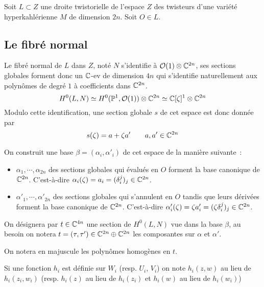 \documentclass[a4paper,10pt,draft,makeidx,twocolumn]{amsart}
\begin{document}
Soit $L \subset Z$ une droite twistorielle de l'espace $Z$ des twisteurs d'une variété hyperkahlérienne $M$ de dimension $2n$. Soit $O \in L$.

\subsection{Le fibré normal}
Le fibré normal de $L$ dans $Z$, noté $N$ s'identifie à $\mathcal{O}(1) \otimes \mathbb{C}^{2n}$, ses sections globales forment donc un $\mathbb{C}$-ev de dimension $4n$ qui s'identifie naturellement aux polynômes de degré $1$ à coefficients dans $\mathbb{C}^{2n}$.
\begin{equation}
H^0(L,N) \simeq H^0(\mathbb{P}^1, \mathcal{O}(1)) \otimes \mathbb{C}^{2n} \simeq \mathbb{C}[\zeta]^1 \otimes \mathbb{C}^{2n}
\end{equation}
Modulo cette identification, une section globale $s$ de cet espace est donc donnée par
\begin{equation}
s(\zeta) = a + \zeta a' \qquad  a,a' \in \mathbb{C}^{2n}
\end{equation}

On construit une base $\beta = (\alpha_i, \alpha'_i)$ de cet espace de la manière suivante~:
\begin{itemize}
\item $\alpha_1, \cdots, \alpha_{2n}$ des sections globales qui évalués en $O$ forment la base canonique de $\mathbb{C}^{2n}$.
C'est-à-dire $\alpha_i(\zeta) = a_i = (\delta_i^j)_j \in \mathbb{C}^{2n}$. 
\item $\alpha'_1, \cdots, \alpha'_{2n}$ des sections globales qui s'annulent en $O$ tandis que leurs dérivées forment la base canonique de $\mathbb{C}^{2n}$.
C'est-à-dire $\alpha'_i(\zeta) = \zeta a'_i = (\zeta \delta_i^j)_j \in \mathbb{C}^{2n}$. 
\end{itemize}

On désignera par $t \in \mathbb{C}^{4n}$ une section de $H^0(L,N)$ vue dans la base $\beta$, au besoin on notera $t = (\tau, \tau') \in \mathbb{C}^{2n} \oplus \mathbb{C}^{2n}$ les composantes sur $\alpha$ et $\alpha'$.

On notera en majuscule les polynômes homogènes en $t$.


Si une fonction $h_i$ est définie sur $W_i$ (resp. $U_i$, $V_i$) on note $h_i(z,w)$ au lieu de $h_i(z_i,w_i)$ (resp. $h_i(z)$ au lieu de $h_i(z_i)$ et $h_i(w)$ au lieu de $h_i(w_i)$)
\end{document}
